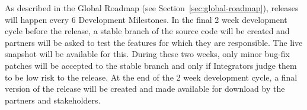 \documentclass{learnpad}
\begin{document}
As described in the Global Roadmap (see Section~\ref{sec:global-roadmap}), releases will happen
every 6 Development Milestones. In the final 2 week development cycle before the release, a stable
branch of the source code will be created and partners will be asked to test the features for
which they are responsible. The live snapshot will be available for this. During these two weeks,
only minor bug-fix patches will be accepted to the stable branch and only if Integrators judge them
to be low risk to the release. At the end of the 2 week development cycle, a final version of the
release will be created and made available for download by the partners and stakeholders.


 

\end{document}
